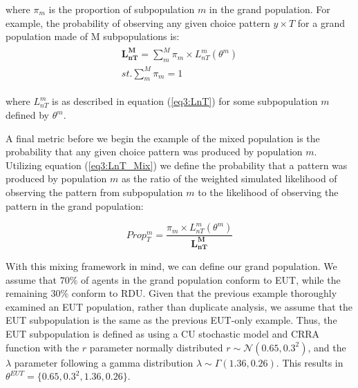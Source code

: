 \documentclass[../main.tex]{subfiles}
\begin{document}
\noindent where $\pi_m$ is the proportion of subpopulation $m$ in the grand population.
For example, the probability of observing any given choice pattern $y \times T$ for a grand population made of M subpopulations is:
\begin{align}
	\label{eq3:LnT_Mix}
	\begin{split}
		\bm{L_{nT}^M} = \sum_m^M \pi_m \times L_{nT}^m(\theta^m) \\ 
		\mathit{st.} \sum_m^M \pi_m = 1
	\end{split}
\end{align}

\noindent where $L_{nT}^m$ is as described in equation (\ref{eq3:LnT}) for some subpopulation $m$ defined by $\theta^m$.

A final metric before we begin the example of the mixed population is the probability that any given choice pattern was produced by population $m$.
Utilizing equation (\ref{eq3:LnT_Mix}) we define the probability that a pattern was produced by population $m$ as the ratio of the weighted simulated likelihood of observing the pattern from subpopulation $m$ to the likelihood of observing the pattern in the grand population:

\begin{equation}
	\label{eq3:Propm}
	\mathit{Prop^m_{T}} = \frac{\pi_m \times L_{nT}^m(\theta^m) }{\bm{L_{nT}^M}}
\end{equation}

With this mixing framework in mind, we can define our grand population.
We assume that $70\%$ of agents in the grand population conform to EUT, while the remaining $30\%$ conform to RDU.
Given that the previous example thoroughly examined an EUT population, rather than duplicate analysis, we assume that the EUT subpopulation is the same as the previous EUT-only example.
Thus, the EUT subpopulation is defined as using a CU stochastic model and CRRA function with the $r$ parameter normally distributed $r \sim \mathcal{N}(0.65 , 0.3^2 )$, and the $\lambda$ parameter following a gamma distribution $\lambda \sim \Gamma(1.36 , 0.26)$.
This results in $\theta^{EUT} = \lbrace 0.65 ,0.3^2, 1.36 , 0.26\rbrace$.
\end{document}
